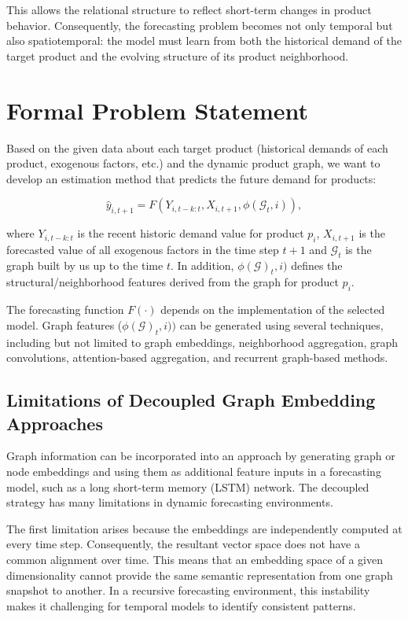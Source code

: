 This allows the relational structure to reflect short-term changes in product behavior. Consequently, the forecasting problem becomes not only temporal but also spatiotemporal: the model must learn from both the historical demand of the target product and the evolving structure of its product neighborhood.

\section{Formal Problem Statement}
\label{sec:formal_problem_statement}
Based on the given data about each target product (historical demands of each product, exogenous factors, etc.) and the dynamic product graph, we want to develop an estimation method that predicts the future demand for products:

\[ \hat{ y }_{ i , t + 1} = F \left( { Y _{ i , t - k : t}, X_{ i , t + 1}, \phi \left( {\mathcal{G}}_t,i \right)} \right), \]

where $ Y _{ i , t - k : t}$ is the recent historic demand value for product $ p _i$, $ X_{ i , t + 1}$ is the forecasted value of all exogenous factors in the time step $t + 1$ and $\mathcal{G}_t$ is the graph built by us up to the time $t$. In addition, $\phi (\mathcal{G})_t,i)$ defines the structural/neighborhood features derived from the graph for product $ p _i$.

The forecasting function $ F (\cdot )$ depends on the implementation of the selected model. Graph features ($ \phi (\mathcal{G})_t,i))$ can be generated using several techniques, including but not limited to graph embeddings, neighborhood aggregation, graph convolutions, attention-based aggregation, and recurrent graph-based methods.

\subsection{Limitations of Decoupled Graph Embedding Approaches}
\label{subsec:limitations_decoupled_embeddings}

Graph information can be incorporated into an approach by generating graph or node embeddings and using them as additional feature inputs in a forecasting model, such as a long short-term memory (LSTM) network. The decoupled strategy has many limitations in dynamic forecasting environments.

The first limitation arises because the embeddings are independently computed at every time step. Consequently, the resultant vector space does not have a common alignment over time. This means that an embedding space of a given dimensionality cannot provide the same semantic representation from one graph snapshot to another. In a recursive forecasting environment, this instability makes it challenging for temporal models to identify consistent patterns.

